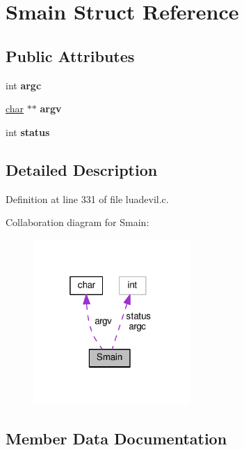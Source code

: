 \hypertarget{structSmain}{}\section{Smain Struct Reference}
\label{structSmain}
\subsection*{Public Attributes}
\begin{DoxyCompactItemize}
\item 
\mbox{\label{structSmain_a9dc080b9a8d0eb2d21a1982ed8280374}} 
int {\bfseries argc}
\item 
\mbox{\label{structSmain_a2cca5942f822cee2e819694285acbd2c}} 
\hyperlink{classchar}{char} $\ast$$\ast$ {\bfseries argv}
\item 
\mbox{\label{structSmain_af22c8bf033c96eaa9e0e29264fc9631e}} 
int {\bfseries status}
\end{DoxyCompactItemize}


\subsection{Detailed Description}


Definition at line 331 of file luadevil.\+c.



Collaboration diagram for Smain\+:
\nopagebreak
\begin{figure}[H]
\begin{center}
\leavevmode
\includegraphics[width=169pt]{d5/d6a/structSmain__coll__graph}
\end{center}
\end{figure}


\subsection{Member Data Documentation}
\mbox{\label{structSmain_a9dc080b9a8d0eb2d21a1982ed8280374}} 
